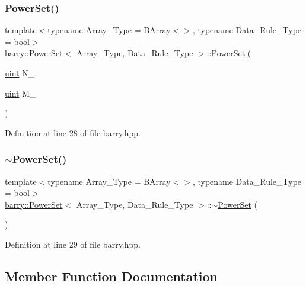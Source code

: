 \subsubsection{\texorpdfstring{Power\+Set()}{PowerSet()}\hspace{0.1cm}{\footnotesize\ttfamily [2/2]}}
{\footnotesize\ttfamily template$<$typename Array\+\_\+\+Type  = B\+Array$<$$>$, typename Data\+\_\+\+Rule\+\_\+\+Type  = bool$>$ \\
\hyperlink{classbarry_1_1_power_set}{barry\+::\+Power\+Set}$<$ Array\+\_\+\+Type, Data\+\_\+\+Rule\+\_\+\+Type $>$\+::\hyperlink{classbarry_1_1_power_set}{Power\+Set} (\begin{DoxyParamCaption}\item[{\hyperlink{namespacebarry_a11dfc53ddb4672278319aa04f1e09a6c}{uint}}]{N\+\_\+,  }\item[{\hyperlink{namespacebarry_a11dfc53ddb4672278319aa04f1e09a6c}{uint}}]{M\+\_\+ }\end{DoxyParamCaption})\hspace{0.3cm}{\ttfamily [inline]}}



Definition at line 28 of file barry.\+hpp.

\mbox{\label{classbarry_1_1_power_set_a3b9c1162ec54be631e1f01d085177b8d}} 
\subsubsection{\texorpdfstring{$\sim$\+Power\+Set()}{~PowerSet()}}
{\footnotesize\ttfamily template$<$typename Array\+\_\+\+Type  = B\+Array$<$$>$, typename Data\+\_\+\+Rule\+\_\+\+Type  = bool$>$ \\
\hyperlink{classbarry_1_1_power_set}{barry\+::\+Power\+Set}$<$ Array\+\_\+\+Type, Data\+\_\+\+Rule\+\_\+\+Type $>$\+::$\sim$\hyperlink{classbarry_1_1_power_set}{Power\+Set} (\begin{DoxyParamCaption}{ }\end{DoxyParamCaption})\hspace{0.3cm}{\ttfamily [inline]}}



Definition at line 29 of file barry.\+hpp.



\subsection{Member Function Documentation}
\mbox{\label{classbarry_1_1_power_set_a00ee318a40da91bcf0bff79bf71454ab}} 
